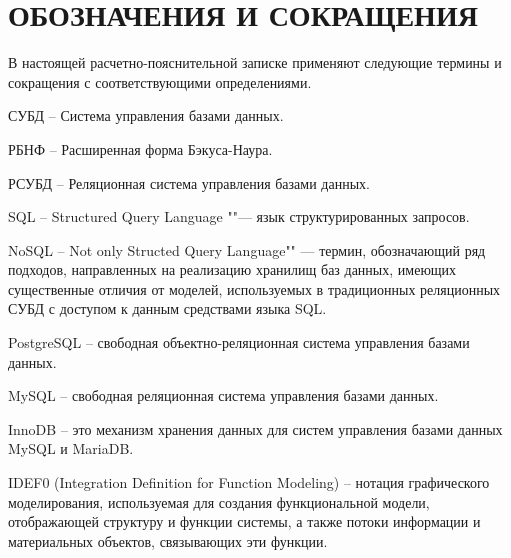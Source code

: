 
\chapter*{ОБОЗНАЧЕНИЯ И СОКРАЩЕНИЯ}

В настоящей расчетно-пояснительной записке применяют следующие термины и сокращения с соответствующими определениями.

СУБД -- Система управления базами данных.

РБНФ -- Расширенная форма Бэкуса-Наура.

РСУБД -- Реляционная система управления базами данных.

SQL -- Structured Query Language ""--- язык структурированных запросов.

NoSQL -- Not only Structed Query Language"" --- термин, обозначающий ряд подходов, направленных на реализацию хранилищ баз данных, имеющих существенные отличия от моделей, используемых в традиционных реляционных СУБД с доступом к данным средствами языка SQL.

PostgreSQL -- свободная объектно-реляционная система управления базами данных.

MySQL -- свободная реляционная система управления базами данных.

InnoDB -- это механизм хранения данных для систем управления базами данных MySQL и MariaDB.

IDEF0 (Integration Definition for Function Modeling) -- нотация графического моделирования, используемая для создания функциональной модели, отображающей структуру и функции системы, а также потоки информации и материальных объектов, связывающих эти функции. 